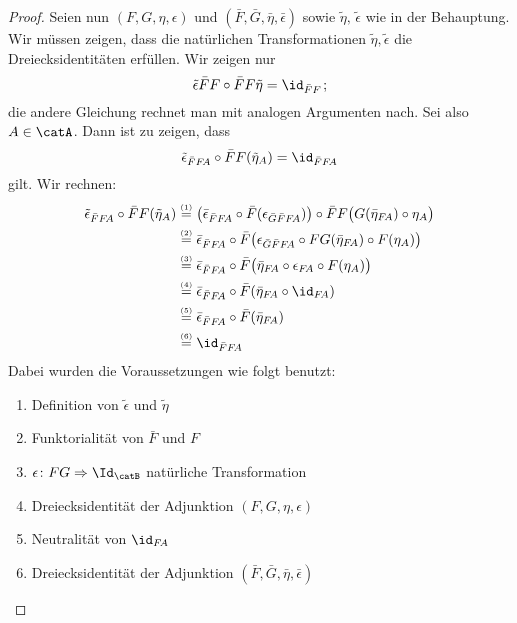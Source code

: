 \begin{proof}
    \smallskip\noindent
    Seien nun $(F,G,\eta,\epsilon)$ und $(\bar F, \bar G, \bar\eta,
    \bar\epsilon)$ sowie $\tilde\eta,\,\tilde\epsilon$ wie in der Behauptung.
    Wir müssen zeigen, dass die natürlichen Transformationen
    $\tilde\eta,\tilde\epsilon$ die Dreiecksidentitäten erfüllen.
    Wir zeigen nur
    \[ \tilde\epsilon\bar FF \after \bar FF\tilde\eta = \id_{\bar FF}  \mkern2mu; \]
    die andere Gleichung rechnet man mit analogen Argumenten nach.
    Sei also $A\in\catA$. Dann ist zu zeigen, dass
    \[ \tilde\epsilon_{\bar FF\!A} \after \bar FF(\tilde\eta_A) = \id_{\bar FF\!A} \]
    gilt. Wir rechnen:
    \begin{align*}
        \tilde\epsilon_{\bar FF\!A} \after \bar FF(\tilde\eta_A)
        &\overset{\scriptscriptstyle(1)}=
            \bigl( \bar\epsilon_{\bar FF\!A} \after 
                \bar F(\epsilon_{\bar G\bar FF\!A}) \bigr)
            \after
            \bar FF\bigl( G(\bar\eta_{F\!A})\after \eta_A \bigr)
        \\
        &\overset{\scriptscriptstyle(2)}= 
            \bar\epsilon_{\bar FF\!A} \after 
            \bar F\bigl( 
            \epsilon_{\bar G\bar FF\!A} \after
            FG(\bar\eta_{F\!A})\after F(\eta_A) \bigr)
        \\
        &\overset{\scriptscriptstyle(3)}= 
            \bar\epsilon_{\bar FF\!A} \after 
            \bar F\bigl( 
            \bar\eta_{F\!A}\after \epsilon_{F\!A}
            \after F(\eta_A) \bigr)
        \\
        &\overset{\scriptscriptstyle(4)}= 
            \bar\epsilon_{\bar FF\!A} \after 
            \bar F( \bar\eta_{F\!A}\after \id_{F\!A} )
        \\
        &\overset{\scriptscriptstyle(5)}= 
            \bar\epsilon_{\bar FF\!A} \after 
            \bar F(\bar\eta_{F\!A})
        \\
        &\overset{\scriptscriptstyle(6)}= 
            \id_{\bar FF\!A}
    \end{align*}
    Dabei wurden die Voraussetzungen wie folgt benutzt:
    \begin{enumerate}[(1)]
        \item
            Definition von $\tilde\epsilon$ und $\tilde\eta$
        \item
            Funktorialität von $\bar F$ und $F$
        \item
            $\epsilon\colon FG\nattrafoto\Id_\catB$ natürliche Transformation
        \item
            Dreiecksidentität der Adjunktion $(F,G,\eta,\epsilon)$
        \item
            Neutralität von $\id_{F\!A}$
        \item
            Dreiecksidentität der Adjunktion 
            $(\bar F,\bar G,\bar\eta,\bar\epsilon)$
    \end{enumerate}
\end{proof}

